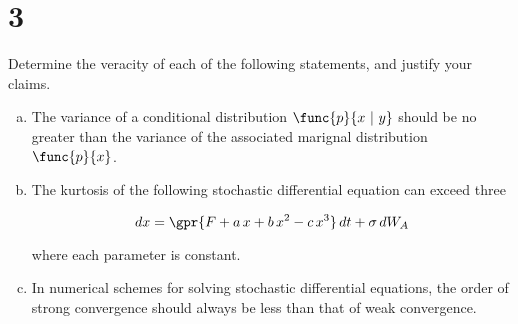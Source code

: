 \section{3}

Determine the veracity of each of the following statements, and justify your claims.

\begin{enumerate}[a)]
	\item The variance of a conditional distribution $\func{p}{x\ \vert\ y}$ should be no greater than the variance of the associated marignal distribution $\func{p}{x}$.
	
	\item The kurtosis of the following stochastic differential equation can exceed three
	
		\begin{equation}
			dx = \gpr{F + a\,x + b\,x^2 - c\,x^3}\,dt + \sigma\,d{W_{A}}
		\end{equation}
		
		where each parameter is constant.
		
	\item In numerical schemes for solving stochastic differential equations, the order of strong convergence should always be less than that of weak convergence.	
\end{enumerate}

